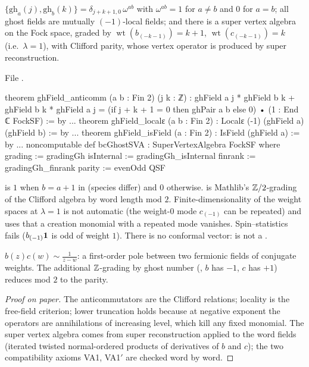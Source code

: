 \begin{theorem}\label{l17:thm:bc}
$\{\mathrm{gh}_a(j),\mathrm{gh}_b(k)\}=\delta_{j+k+1,0}\,\omega^{ab}$ with $\omega^{ab}=1$ for $a\neq b$
and $0$ for $a=b$; all ghost fields are mutually $(-1)$-local fields; and there is a super vertex algebra
 on the Fock space, graded by $\operatorname{wt}(b_{(-k-1)})=k+1$,
$\operatorname{wt}(c_{(-k-1)})=k$ (i.e.\ $\lambda=1$), with Clifford parity, whose vertex operator is
produced by super reconstruction.
\end{theorem}
\noindent File .
\begin{leancode}
theorem ghField_anticomm (a b : Fin 2) (j k : ℤ) :
    ghField a j * ghField b k + ghField b k * ghField a j
      = (if j + k + 1 = 0 then ghPair a b else 0) • (1 : End ℂ FockSF) := by
...
theorem ghField_localε (a b : Fin 2) : Localε (-1) (ghField a) (ghField b) := by
...
theorem ghField_isField (a : Fin 2) : IsField (ghField a) := by
...
noncomputable def bcGhostSVA : SuperVertexAlgebra FockSF where
  grading := gradingGh
  isInternal := gradingGh_isInternal
  finrank := gradingGh_finrank
  parity := evenOdd QSF
\end{leancode}
\begin{dictionary}
 is $1$ when $b=a+1$ in  (species differ) and $0$ otherwise.
 is Mathlib's ${\mathbb{Z}}/2$-grading of the Clifford algebra by word length mod $2$.
Finite-dimensionality of the weight spaces at $\lambda=1$ is not automatic (the weight-$0$ mode $c_{(-1)}$
can be repeated) and uses that a creation monomial with a repeated mode vanishes. Spin--statistics
fails ($b_{(-1)}\mathbf{1}$ is odd of weight $1$). There is no conformal vector: 
is not a .
\end{dictionary}
\begin{physics}
$b(z)c(w)\sim\frac1{z-w}$: a first-order pole between two fermionic fields of conjugate weights. The
additional ${\mathbb{Z}}$-grading by ghost number (, $b$ has $-1$, $c$ has $+1$) reduces mod $2$
to the parity.
\end{physics}
\begin{proof}[Proof on paper]
The anticommutators are the Clifford relations; locality is the free-field criterion; lower
truncation holds because at negative exponent the operators are annihilations of increasing level,
which kill any fixed monomial. The super vertex algebra comes from super reconstruction applied to
the word fields (iterated twisted normal-ordered products of derivatives of $b$ and $c$); the two
compatibility axioms VA1, VA1$'$ are checked word by word.
\end{proof}
